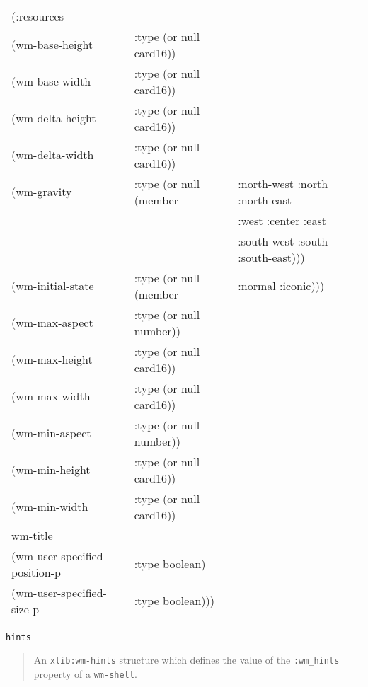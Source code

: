 \begin{flushright} \parbox[t]{6.125in}{
\tt
\begin{tabular}{lll}
\raggedright
(:resources & & \\
    (wm-base-height   &:type (or null card16)) \\
    (wm-base-width    &:type (or null card16))              \\
    (wm-delta-height  &:type (or null card16))                  \\
    (wm-delta-width   &:type (or null card16))               \\
    (wm-gravity       &:type (or null (member &        :north-west :north  :north-east \\
&&                             		        :west       :center :east\\
&&                                     		:south-west :south  :south-east)))\\          
    (wm-initial-state &:type (or null (member &:normal :iconic))) \\
    (wm-max-aspect    &:type (or null number))              \\
    (wm-max-height    &:type (or null card16))              \\
    (wm-max-width     &:type (or null card16))             \\
    (wm-min-aspect    &:type (or null number))              \\
    (wm-min-height    &:type (or null card16))              \\
    (wm-min-width     &:type (or null card16))             \\
     wm-title\\
    (wm-user-specified-position-p &:type boolean) \\
    (wm-user-specified-size-p     &:type boolean))) \\
\end{tabular}
\rm
}\end{flushright}


\begin{flushright} \parbox[t]{6.125in}{
{\tt hints}
\begin{quote}
An {\tt xlib:wm-hints} structure which defines the value of the
{\tt :wm\_hints} property of a {\tt wm-shell}. 
\end{quote}

}\end{flushright}

